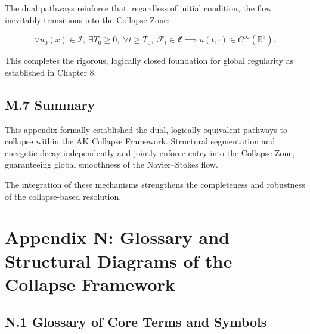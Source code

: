 \documentclass[11pt]{article}
\begin{document}
The dual pathways reinforce that, regardless of initial condition, the flow inevitably transitions into the Collapse Zone:

\[
\forall u_0(x) \in \mathcal{I},\; \exists T_0 \geq 0,\; \forall t \geq T_0,\; \mathcal{F}_t \in \mathfrak{C} \implies u(t, \cdot) \in C^\infty(\mathbb{R}^3).
\]

This completes the rigorous, logically closed foundation for global regularity as established in Chapter 8.

\subsection*{M.7 Summary}

This appendix formally established the dual, logically equivalent pathways to collapse within the AK Collapse Framework. Structural segmentation and energetic decay independently and jointly enforce entry into the Collapse Zone, guaranteeing global smoothness of the Navier--Stokes flow.

The integration of these mechanisms strengthens the completeness and robustness of the collapse-based resolution.



\section*{Appendix N: Glossary and Structural Diagrams of the Collapse Framework}

\subsection*{N.1 Glossary of Core Terms and Symbols}
\end{document}
